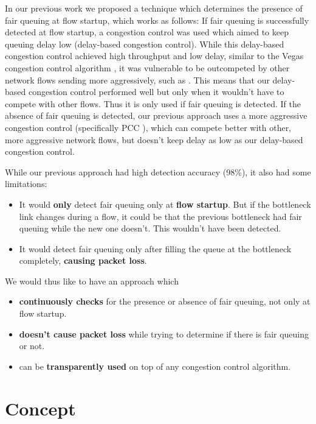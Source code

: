 \documentclass[conference]{IEEEtran}
\begin{document}
In our previous work we proposed a technique which determines the presence of fair queuing at flow startup, which works as follows: 
If fair queuing is successfully detected at flow startup, a congestion control was used which aimed to keep queuing delay low (delay-based congestion control). 
While this delay-based congestion control achieved high throughput and low delay, similar to the Vegas congestion control algorithm \cite{brakmo_tcp_1995}, 
it was vulnerable to be outcompeted by other network flows sending more aggressively, such as \cite{cardwell_bbr_2016,dong_pcc_2015,ha_cubic_2008}.
This means that our delay-based congestion control performed well but only when it wouldn't have to compete with other flows. Thus it is only used if fair queuing is detected. 
If the absence of fair queuing is detected, our previous approach uses a more aggressive congestion control (specifically PCC \cite{dong_pcc_2015}), which can compete better with other, more aggressive network flows,
but doesn't keep delay as low as our delay-based congestion control. 

While our previous approach had high detection accuracy (98\%), it also had some limitations:
\begin{itemize}
    \item It would \textbf{only} detect fair queuing only at \textbf{flow startup}. 
    But if the bottleneck link changes during a flow, it could be that the previous bottleneck had fair queuing while the new one doesn't. This wouldn't have been detected. 
    \item It would detect fair queuing only after filling the queue at the bottleneck completely, \textbf{causing packet loss}. 
\end{itemize}

We would thus like to have an approach which 
\begin{itemize}
    \item \textbf{continuously checks} for the presence or absence of fair queuing, not only at flow startup. 
    \item \textbf{doesn't cause packet loss} while trying to determine if there is fair queuing or not. 
    \item can be \textbf{transparently used} on top of any congestion control algorithm. 
\end{itemize} 

\section{Concept}
\end{document}
